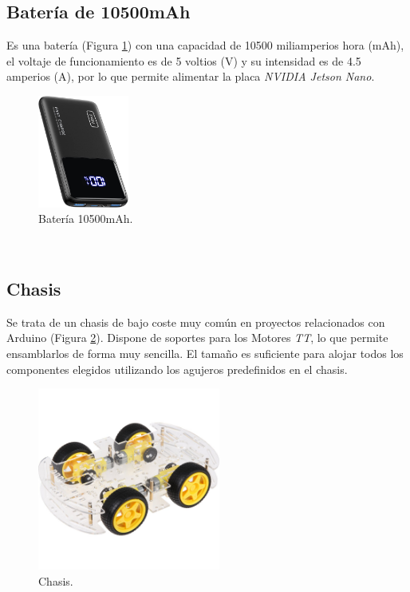 \subsection{Batería de 10500mAh}
\label{subsection:battery}
Es una batería (Figura \ref{fig:battery}) con una capacidad de 10500 miliamperios hora (mAh), el voltaje de funcionamiento es de 5 voltios (V) y su intensidad es de 4.5 amperios (A), por lo que permite alimentar la placa \textit{NVIDIA Jetson Nano}.\\

\begin{figure} [h!]
	\begin{center}
		\includegraphics[width=3cm]{figs/battery2}
	\end{center}
	\caption{Batería 10500mAh.}
	\label{fig:battery}
\end{figure}\

\subsection{Chasis}
\label{subsection:chasis}
Se trata de un chasis de bajo coste muy común en proyectos relacionados con Arduino (Figura \ref{fig:chasis}). Dispone de soportes para los Motores \textit{TT}, lo que permite ensamblarlos de forma muy sencilla. El tamaño es suficiente para alojar todos los componentes elegidos utilizando los agujeros predefinidos en el chasis.\\

\begin{figure} [h!]
	\begin{center}
		\includegraphics[width=6cm]{figs/chasis}
	\end{center}
	\caption{Chasis.}
	\label{fig:chasis}
\end{figure}\

